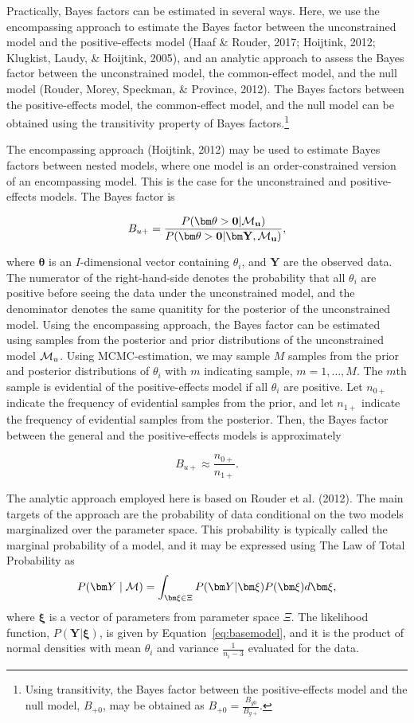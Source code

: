 \documentclass[english,,man]{apa6}
\begin{document}
Practically, Bayes factors can be estimated in several ways. Here, we use the encompassing approach to estimate the Bayes factor between the unconstrained model and the positive-effects model (Haaf \& Rouder, 2017; Hoijtink, 2012; Klugkist, Laudy, \& Hoijtink, 2005), and an analytic approach to assess the Bayes factor between the unconstrained model, the common-effect model, and the null model (Rouder, Morey, Speckman, \& Province, 2012). The Bayes factors between the positive-effects model, the common-effect model, and the null model can be obtained using the transitivity property of Bayes factors.\footnote{Using transitivity, the Bayes factor between the positive-effects model and the null model, \(B_{+0}\), may be obtained as \(B_{+0} = \frac{B_{g0}}{B_{g+}}\).}

The encompassing approach (Hoijtink, 2012) may be used to estimate Bayes factors between nested models, where one model is an order-constrained version of an encompassing model. This is the case for the unconstrained and positive-effects models. The Bayes factor is

\[
B_{u+} = \frac{P(\bm \theta> \bf0 | {\cal M}_u)}{P(\bm \theta> \bf0 | \bm Y, {\cal M}_u)},
\]

where \(\bm \theta\) is an \(I\)-dimensional vector containing \(\theta_i\), and \(\bm Y\) are the observed data. The numerator of the right-hand-side denotes the probability that all \(\theta_i\) are positive before seeing the data under the unconstrained model, and the denominator denotes the same quanitity for the posterior of the unconstrained model. Using the encompassing approach, the Bayes factor can be estimated using samples from the posterior and prior distributions of the unconstrained model \({\cal M}_u\). Using MCMC-estimation, we may sample \(M\) samples from the prior and posterior distributions of \(\theta_i\) with \(m\) indicating sample, \(m = 1, \ldots, M\). The \(m\)th sample is evidential of the positive-effects model if all \(\theta_i\) are positive. Let \(n_{0+}\) indicate the frequency of evidential samples from the prior, and let \(n_{1+}\) indicate the frequency of evidential samples from the posterior. Then, the Bayes factor between the general and the positive-effects models is approximately

\[
B_{u+} \approx \frac{n_{0+}}{n_{1+}}.
\]

The analytic approach employed here is based on Rouder et al. (2012). The main targets of the approach are the probability of data conditional on the two models marginalized over the parameter space. This probability is typically called the marginal probability of a model, and it may be expressed using The Law of Total Probability as
\begin{equation} \label{eq:bfInt}
P(\bm Y\mid {\cal M}) = \int_{\bm \xi\in \Xi} P(\bm Y|\bm \xi)P(\bm \xi)d\bm \xi,
\end{equation}
where \(\bm \xi\) is a vector of parameters from parameter space \(\Xi\). The likelihood function, \(P(\bm Y|\bm \xi)\), is given by Equation~\eqref{eq:basemodel}, and it is the product of normal densities with mean \(\theta_i\) and variance \(\frac{1}{n_i - 3}\) evaluated for the data.
\end{document}
